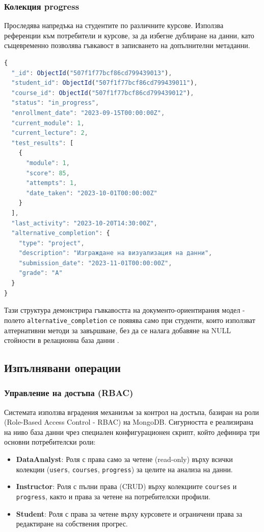 \subsubsection{Колекция progress}

Проследява напредъка на студентите по различните курсове. Използва референции към потребители и курсове, за да избегне дублиране на данни, като същевременно позволява гъвкавост в записването на допълнителни метаданни.

\begin{lstlisting}[language=JavaScript]
{
  "_id": ObjectId("507f1f77bcf86cd799439013"),
  "student_id": ObjectId("507f1f77bcf86cd799439011"),
  "course_id": ObjectId("507f1f77bcf86cd799439012"),
  "status": "in_progress",
  "enrollment_date": "2023-09-15T00:00:00Z",
  "current_module": 1,
  "current_lecture": 2,
  "test_results": [
    {
      "module": 1,
      "score": 85,
      "attempts": 1,
      "date_taken": "2023-10-01T00:00:00Z"
    }
  ],
  "last_activity": "2023-10-20T14:30:00Z",
  "alternative_completion": {
    "type": "project",
    "description": "Изграждане на визуализация на данни",
    "submission_date": "2023-11-01T00:00:00Z",
    "grade": "A"
  }
}
\end{lstlisting}

Тази структура демонстрира гъвкавостта на документо-ориентирания модел - полето \texttt{alternative\_completion} се появява само при студенти, които използват алтернативни методи за завършване, без да се налага добавяне на NULL стойности в релационна база данни \cite{json_schema}.

\subsection{Изпълнявани операции}

\subsubsection{Управление на достъпа (RBAC)}

Системата използва вградения механизъм за контрол на достъпа, базиран на роли (Role-Based Access Control - RBAC) на MongoDB. Сигурността е реализирана на ниво база данни чрез специален конфигурационен скрипт, който дефинира три основни потребителски роли:

\begin{itemize}
    \item \textbf{DataAnalyst}: Роля с права само за четене (read-only) върху всички колекции (\texttt{users}, \texttt{courses}, \texttt{progress}) за целите на анализа на данни.
    \item \textbf{Instructor}: Роля с пълни права (CRUD) върху колекциите \texttt{courses} и \texttt{progress}, както и права за четене на потребителски профили.
    \item \textbf{Student}: Роля с права за четене върху курсовете и ограничени права за редактиране на собствения прогрес.
\end{itemize}

